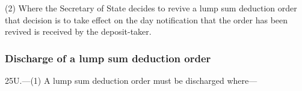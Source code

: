 \documentclass[12pt,a4paper]{article}
\begin{document}
(2) Where the 
Secretary of State  %
decides to revive a lump sum deduction order that decision is to take effect on the day notification that the order has been revived is received by the deposit-taker.


\subsubsection[25U. Discharge of a lump sum deduction order]{Discharge of a lump sum deduction order}

25U.---(1)  A lump sum deduction order must be discharged where—
\end{document}
